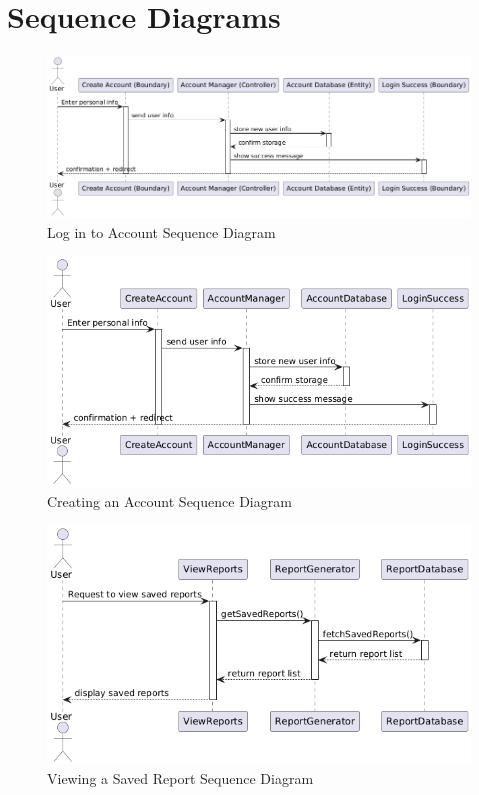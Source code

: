 \documentclass[]{article}
\numberwithin{figure}{section}
\begin{document}
\clearpage 


\section{Sequence Diagrams}
\label{sec:sequence_diagrams}
\begin{figure}[h]
    \centering
    \includegraphics[scale=0.5]{login_sequence.png}
    \caption{Log in to Account Sequence Diagram}
    \label{fig:login_sequence}
\end{figure}
\clearpage

\begin{figure}[h]
    \centering
    \includegraphics[scale=0.5]{CreateAccount_sequence.png}
    \caption{Creating an Account Sequence Diagram}
    \label{fig:CreateAccount_sequence}
\end{figure}
\clearpage

\begin{figure}[h]
    \centering
    \includegraphics[scale=0.5]{ViewSavedReports_sequence.png}
    \caption{Viewing a Saved Report Sequence Diagram}
    \label{fig:ViewSavedReports_sequence}
\end{figure}
\clearpage
\end{document}
